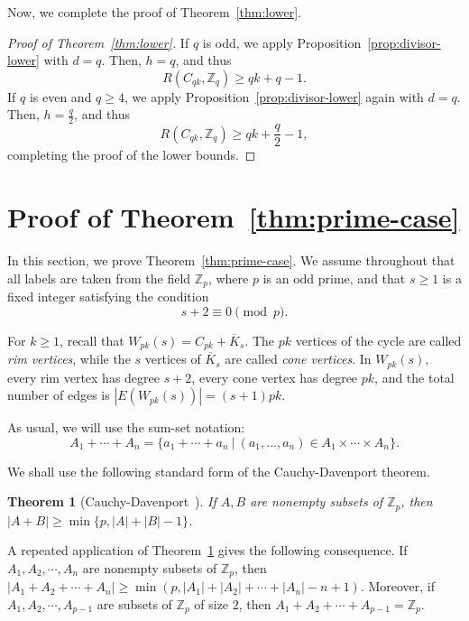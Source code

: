 \documentclass[11pt]{article}
\newtheorem{theorem}{Theorem}[section]
\theoremstyle{remark}
\newcommand{\Z}{\mathbb Z}
\begin{document}
Now, we complete the proof of Theorem~\ref{thm:lower}.

\begin{proof}[Proof of Theorem~\ref{thm:lower}]
    If $q$ is odd, we apply Proposition~\ref{prop:divisor-lower} with $d=q$.
    Then, $h=q$, and thus
    \[
        R(C_{qk},\Z_q)\ge qk+q-1.
    \]
    If $q$ is even and $q\ge 4$, we apply Proposition~\ref{prop:divisor-lower} again with $d=q$.
    Then, $h=\frac{q}{2}$, and thus
    \[
        R(C_{qk},\Z_q)\ge qk+\frac q2-1,
    \]
    completing the proof of the lower bounds.
\end{proof}




\section{Proof of Theorem~\ref{thm:prime-case}}
In this section, we prove Theorem~\ref{thm:prime-case}.  We assume throughout that all labels are taken from the field $\Z_p$, where $p$ is an odd prime, and that $s\ge1$ is a fixed integer satisfying the condition
\begin{equation}\label{eq:congruence-condition}
    s+2\equiv0\pmod p.
\end{equation}

For $k\ge1$, recall that $W_{pk}(s)=C_{pk}+\overline K_s$.
The $pk$ vertices of the cycle are called \emph{rim vertices}, while the $s$ vertices of $\overline K_s$ are called \emph{cone vertices}.
In $W_{pk}(s)$, every rim vertex has degree $s+2$, every cone vertex has degree $pk$, and the total number of edges is $|E(W_{pk}(s))|=(s+1)pk$.

As usual, we will use the sum-set notation:
\[A_1+\cdots+A_n=\{a_1+\cdots+a_n\ |\ (a_1,...,a_n)\in A_1\times\cdots\times A_n\}.\]

We shall use the following standard form of the Cauchy-Davenport theorem.

\begin{theorem}[Cauchy-Davenport~{\cite{Cauchy1813,Davenport1935}}]\label{thm:cauchy-davenport}
    If $A,B$ are nonempty subsets of $\Z_p$, then $|A+B|\ge \min\{p,|A|+|B|-1\}$.
\end{theorem}

A repeated application of Theorem~\ref{thm:cauchy-davenport} gives the following consequence.
If $A_1, A_2, \cdots, A_n$ are nonempty
subsets of $\Z_p$, then
$|A_1 + A_2 +\cdots+ A_n| \ge \min(p, |A_1| + |A_2| +\cdots+|A_n|-n+1)$.
Moreover, if $A_1, A_2, \cdots, A_{p-1}$ are
subsets of $\Z_p$ of size $2$, then $A_1 + A_2 +\cdots+ A_{p-1} = \Z_p$.
\end{document}
